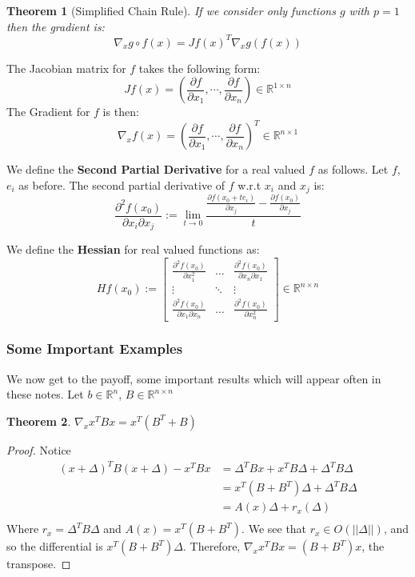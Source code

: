 \documentclass[]{article}
\theoremstyle{mattstyle}
\newtheorem{theorem}{Theorem}[section]
\theoremstyle{definition}
\begin{document}
\begin{theorem}[Simplified Chain Rule]
If we consider only functions $g$ with $p=1$ then the gradient is: $$\nabla_x g \circ f(x) = Jf(x)^T\nabla_{x}g(f(x))$$
\end{theorem} 

The Jacobian matrix for $f$ takes the following form: 
$$J f(x) = \left(\frac{\partial f}{\partial x_1}, \cdots, \frac{\partial f}{\partial x_n}\right) \in \mathbb{R}^{1 \times n}$$
The Gradient for $f$ is then: 
$$\nabla_{x} f(x) = \left(\frac{\partial f}{\partial x_1}, \cdots, \frac{\partial f}{\partial x_n}\right)^T \in \mathbb{R}^{n \times 1}$$

We define the \textbf{Second Partial Derivative} for a real valued $f$ as follows. Let $f$, $e_i$ as before. The second partial derivative of $f$ w.r.t $x_i$ and $x_j$ is:
$$
\frac{\partial^2 f(x_0)}{\partial x_i \partial x_j} := 
\lim\limits_{t \rightarrow 0} \frac{ \frac{\partial f(x_0+te_i)}{\partial x_j} - \frac{\partial f(x_0)}{\partial x_j} }{t}
$$

We define the \textbf{Hessian} for real valued functions as: 
$$H f(x_0) := \begin{bmatrix}
\frac{\partial^2 f(x_0)}{\partial x_1^2} & \dots  & \frac{\partial^2 f(x_0)}{\partial x_n \partial x_1} \\
\vdots & \ddots & \vdots \\
\frac{\partial^2 f(x_0)}{\partial x_1 \partial x_n} & \dots  & \frac{\partial^2 f(x_0)}{\partial x_n^2}
\end{bmatrix}\in \mathbb{R}^{n \times n}$$

\newpage

\subsubsection{Some Important Examples}

We now get to the payoff, some important results which will appear often in these notes. Let $b \in \mathbb{R}^n$, $B \in \mathbb{R}^{n \times n}$

\begin{theorem}
	$\nabla_{x} x^TBx = x^T(B^T+B)$
\end{theorem}
\begin{proof}
	Notice 
	\begin{align*}
	(x+\Delta)^TB(x+\Delta) - x^TBx &= \Delta^TBx + x^TB\Delta + \Delta^TB\Delta\\
	&= x^T(B + B^T)\Delta + \Delta^TB\Delta\\
	&= A(x)\Delta + r_{x}(\Delta)\\
	\end{align*}
	Where $r_{x}=\Delta^TB\Delta$ and $A(x)=x^T(B + B^T)$. We see that $r_{x}\in O(||\Delta||)$, and so the differential is $x^T(B + B^T)\Delta$. Therefore, $\nabla_x x^TBx = (B + B^T)x$, the transpose.
\end{proof}
\end{document}
